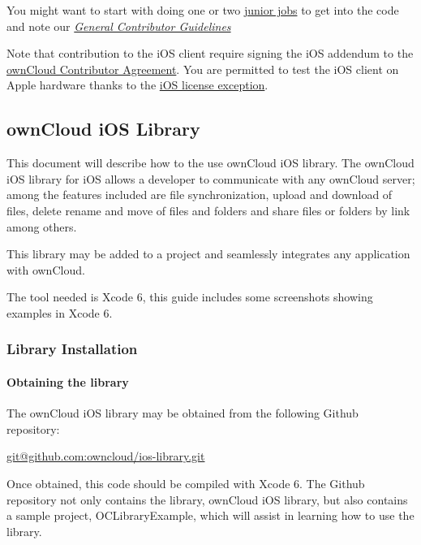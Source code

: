 \documentclass[letterpaper,10pt,english]{sphinxmanual}
\begin{document}
You might want to start with doing one or two \href{https://github.com/owncloud/ios/issues?q=is\%3Aopen+is\%3Aissue+label\%3A\%22Junior+Job\%22}{junior jobs}
to get into the code and note our {\hyperref[general/index::doc]{\emph{General Contributor Guidelines}}}

Note that contribution to the iOS client require signing the iOS addendum to the
\href{https://owncloud.org/contribute/agreement/}{ownCloud Contributor Agreement}. You are
permitted to test the iOS client on Apple hardware thanks to the
\href{https://owncloud.org/contribute/iOS-license-exception/}{iOS license exception}.


\subsection{ownCloud iOS Library}
\label{ios_library/index:owncloud-ios-library}
This document will describe how to the use ownCloud iOS library.  The ownCloud
iOS library for iOS allows a developer to communicate with any ownCloud server;
among the features included are file synchronization, upload and download of
files, delete rename and move of files and folders and share files or folders
by link among others.

This library may be added to a project and seamlessly integrates any
application with ownCloud.

The tool needed is Xcode 6, this guide includes some screenshots showing
examples in Xcode 6.
\label{ios_library/index:iosindex}

\subsubsection{Library Installation}
\label{ios_library/library_installation:library-installation}\label{ios_library/library_installation::doc}

\paragraph{Obtaining the library}
\label{ios_library/library_installation:obtaining-the-library}
The ownCloud iOS library may be obtained from the following Github repository:

\href{mailto:git@github.com:owncloud/ios-library.git}{git@github.com:owncloud/ios-library.git}

Once obtained, this code should be compiled with Xcode 6.  The Github
repository not only contains the library, ownCloud iOS library, but also
contains a sample project, OCLibraryExample, which will assist in learning how
to use the library.
\end{document}
